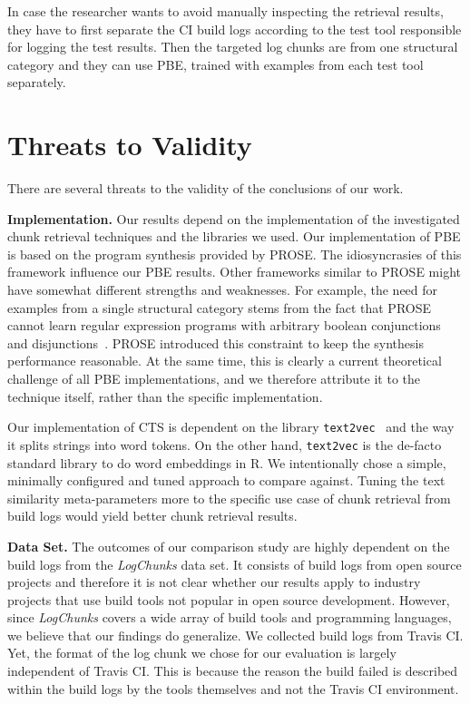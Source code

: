 In case the researcher wants to avoid manually inspecting the
retrieval results, they have to first separate the CI build logs
according to the test tool responsible for logging the test results.
Then the targeted log chunks are from one structural category and they
can use PBE, trained with examples from each test tool separately.

\section{Threats to Validity}
There are several threats to the validity of the conclusions of our
work.


\textbf{Implementation.}
Our results depend on the implementation of the investigated chunk
retrieval techniques and the libraries we used.
Our implementation of
PBE is based on the program synthesis provided by PROSE\@.
The
idiosyncrasies of this framework influence our PBE results.
Other
frameworks similar to PROSE might have somewhat different strengths
and weaknesses.
For example, the need for examples from a single
structural category stems from the fact that PROSE cannot learn
regular expression programs with arbitrary boolean conjunctions and
disjunctions~\cite{mayer2015user}.
PROSE introduced this constraint to
keep the synthesis performance reasonable.
At the same time, this is
clearly a current theoretical challenge of all PBE implementations,
and we therefore attribute it to the technique itself, rather than the
specific implementation.

Our implementation of CTS is dependent on the library
{\tt text2vec}~\cite{text2vec2019webpage}
and the way it splits strings into word tokens.
On the other hand,
{\tt text2vec} is the de-facto standard library to do word embeddings
in R.
We intentionally chose a simple, minimally configured and tuned
approach to compare against.
Tuning the text similarity
meta-parameters more to the specific use case of chunk retrieval from
build logs would yield better chunk retrieval results.


\textbf{Data Set.}
The outcomes of our comparison study are highly dependent on the build
logs from the \emph{LogChunks} data set.
It consists of build
logs from open source projects and therefore it is not clear whether
our results apply to industry projects that use build tools
not popular in open source development.
However, since \emph{LogChunks} covers a wide array of build tools and programming languages,
we believe that our findings do generalize.
We collected build logs from Travis CI.
Yet, the format of the log chunk we chose
for our evaluation is largely independent of Travis CI\@.
This
is because the reason the build failed is described within the build
logs by the tools themselves and not the Travis CI environment.

